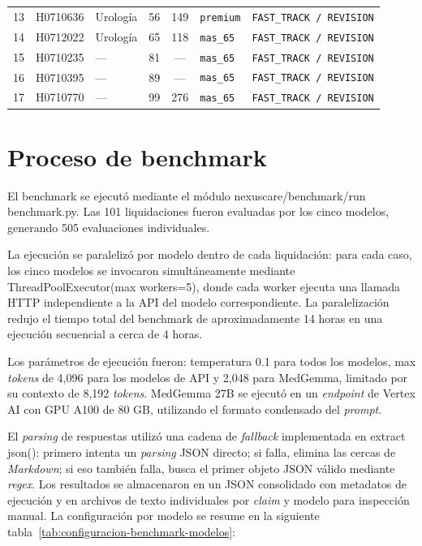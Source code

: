 \begin{table}[H]
\begin{tabular}{
        c
        l
        p{}
        c
        c
        l
        p{}
    }
        13 & H0710636 & Urología                     & 56 & 149 & \texttt{premium} & \texttt{FAST\_TRACK / REVISION} \\
        14 & H0712022 & Urología                     & 65 & 118 & \texttt{mas\_65} & \texttt{FAST\_TRACK / REVISION} \\
        15 & H0710235 & ---                          & 81 & --- & \texttt{mas\_65} & \texttt{FAST\_TRACK / REVISION} \\
        16 & H0710395 & ---                          & 89 & --- & \texttt{mas\_65} & \texttt{FAST\_TRACK / REVISION} \\
        17 & H0710770 & ---                          & 99 & 276 & \texttt{mas\_65} & \texttt{FAST\_TRACK / REVISION} \\

        \bottomrule
    \end{tabular}
\end{table}

\section{Proceso de benchmark}

El benchmark se ejecutó mediante el módulo nexuscare/benchmark/run benchmark.py. Las 101 liquidaciones fueron evaluadas por los cinco modelos, generando 505 evaluaciones individuales.

La ejecución se paralelizó por modelo dentro de cada liquidación: para cada caso, los cinco modelos se invocaron simultáneamente mediante ThreadPoolExecutor(max workers=5), donde cada worker ejecuta una llamada HTTP independiente a la API del modelo correspondiente. La paralelización redujo el tiempo total del benchmark de aproximadamente 14 horas en una ejecución secuencial a cerca de 4 horas.

Los parámetros de ejecución fueron: temperatura 0.1 para todos los modelos, max \textit{tokens} de 4,096 para los modelos de API y 2,048 para MedGemma, limitado por su contexto de 8,192 \textit{tokens}. MedGemma 27B se ejecutó en un \textit{endpoint} de Vertex AI con GPU A100 de 80 GB, utilizando el formato condensado del \textit{prompt}.


El \textit{parsing} de respuestas utilizó una cadena de \textit{fallback} implementada en extract json(): primero intenta un \textit{parsing} JSON directo; si falla, elimina las cercas de \textit{Markdown}; si eso también falla, busca el primer objeto JSON válido mediante \textit{regex}. Los resultados se almacenaron en un JSON consolidado con metadatos de ejecución y en archivos de texto individuales por \textit{claim} y modelo para inspección manual.
La configuración por modelo se resume en la siguiente tabla~\ref{tab:configuracion-benchmark-modelos}:

